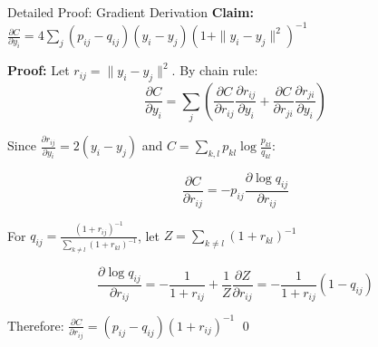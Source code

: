 \documentclass[aspectratio=169]{beamer}
\begin{document}
\begin{frame}{Detailed Proof: Gradient Derivation}
\small
\textbf{Claim:} $\frac{\partial C}{\partial y_i} = 4\sum_j (p_{ij} - q_{ij})(y_i - y_j)(1 + \|y_i - y_j\|^2)^{-1}$

\textbf{Proof:}
Let $r_{ij} = \|y_i - y_j\|^2$. By chain rule:
$$\frac{\partial C}{\partial y_i} = \sum_j \left(\frac{\partial C}{\partial r_{ij}}\frac{\partial r_{ij}}{\partial y_i} + \frac{\partial C}{\partial r_{ji}}\frac{\partial r_{ji}}{\partial y_i}\right)$$

Since $\frac{\partial r_{ij}}{\partial y_i} = 2(y_i - y_j)$ and $C = \sum_{k,l} p_{kl}\log\frac{p_{kl}}{q_{kl}}$:

$$\frac{\partial C}{\partial r_{ij}} = -p_{ij}\frac{\partial \log q_{ij}}{\partial r_{ij}}$$

For $q_{ij} = \frac{(1+r_{ij})^{-1}}{\sum_{k \neq l}(1+r_{kl})^{-1}}$, let $Z = \sum_{k \neq l}(1+r_{kl})^{-1}$

$$\frac{\partial \log q_{ij}}{\partial r_{ij}} = -\frac{1}{1+r_{ij}} + \frac{1}{Z}\frac{\partial Z}{\partial r_{ij}} = -\frac{1}{1+r_{ij}}(1 - q_{ij})$$

Therefore: $\frac{\partial C}{\partial r_{ij}} = (p_{ij} - q_{ij})(1+r_{ij})^{-1}$ \qed
\end{frame}

\end{document}

